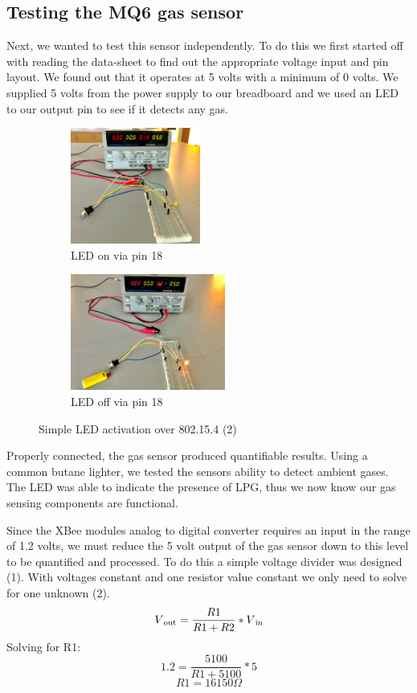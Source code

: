 \subsection{Testing the MQ6 gas sensor}
\par Next, we wanted to test this sensor independently. To do this we first started off with reading the data-sheet to find out the appropriate voltage input and pin layout. We found out that it operates at 5 volts with a minimum of 0 volts. We supplied 5 volts from the power supply to our breadboard and we used an LED to our output pin to see if it detects any gas. 
\begin{figure}[h!]
	\centering
	\begin{subfigure}[t]{0.45\textwidth}
		\centering
		\includegraphics[height=1.5in]{mq6Test.png}
		\caption{LED on via pin 18}
	\end{subfigure}
	\begin{subfigure}[t]{0.45\textwidth}
		\centering
		\includegraphics[height=1.5in]{mq6TestOn.png}
		\caption{LED off via pin 18}
	\end{subfigure}
	\caption{Simple LED activation over 802.15.4 (2)}
\end{figure}
\par Properly connected, the gas sensor produced quantifiable results. Using a common butane lighter, we tested the sensors ability to detect ambient gases. The LED was able to indicate the presence of LPG, thus we now know our gas sensing components are functional.
\par Since the XBee modules analog to digital converter requires an input in the range of 1.2 volts, we must reduce the 5 volt output of the gas sensor down to this level to be quantified and processed. To do this a simple voltage divider was designed (1). With voltages constant and one resistor value constant we only need to solve for one unknown (2).
\begin{equation}
V\textsubscript{out}=\frac{R1}{R1+R2}*V\textsubscript{in}
\end{equation}
Solving for R1: \\
\begin{equation}
1.2 = \frac{5100}{R1+5100}*5
\end{equation}
\[R1 = 16150 \Omega\]

